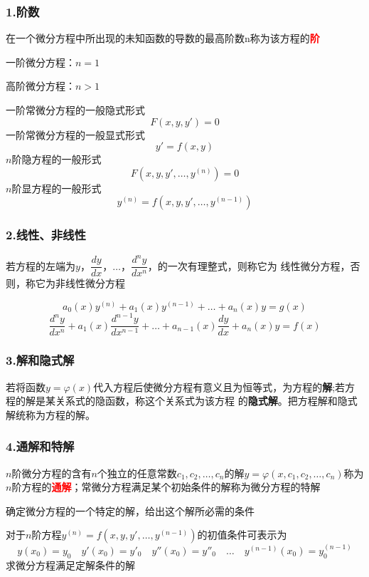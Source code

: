 \documentclass[oneside]{book} %
\begin{document}
\subsubsection{1.阶数}
\noindent {}在一个微分方程中所出现的未知函数的导数的最高阶数n称为该方程的\textbf{\textcolor{red}{阶}}

一阶微分方程：$n = 1$

高阶微分方程：$n > 1$

\noindent {}

\noindent 一阶常微分方程的一般隐式形式
$$ F(x,y,y') = 0$$
一阶常微分方程的一般显式形式
$$y' = f(x,y)$$
$n$阶隐方程的一般形式
$$ F(x,y,y',\dots,y^{(n)}) = 0$$
$n$阶显方程的一般形式
$$y^{(n)} = f(x,y,y',\dots,y^{(n-1)})$$


\subsubsection{2.线性、非线性}
\noindent {}若方程的左端为$y$，$\dfrac{dy}{dx}$，$\dots$，$\dfrac{d^n y}{d x^n} $，的一次有理整式，则称它为
线性微分方程，否则，称它为非线性微分方程

\noindent {}
$$a_{0}(x)y^{(n)} + a_{1}(x)y^{(n - 1)} + \dots + a_{n}(x)y = g(x)$$
$$\frac{d^n y}{d x^n} + a_{1}(x)\frac{d^{n-1} y}{d x^{n-1}} + \dots + a_{n -1}(x)\frac{dy}{dx} + a_{n}(x)y = f(x)  $$


\subsubsection{3.解和隐式解}
\noindent {}若将函数$y = \varphi(x)$代入方程后使微分方程有意义且为恒等式，为方程的\textbf{解};若方程的解是某关系式的隐函数，称这个关系式为该方程
的\textbf{隐式解}。把方程解和隐式解统称为方程的解。

\subsubsection{4.通解和特解}
\noindent {}$n$阶微分方程的含有$n$个独立的任意常数$c_{1},c_{2},\dots,c_{n}$的解$y = \varphi(x,c_{1},c_{2},\dots,c_{n})$称为$n$阶方程的\textcolor{red}{\textbf{通解}}；常微分方程满足某个初始条件的解称为微分方程的特解

\noindent {}确定微分方程的一个特定的解，给出这个解所必需的条件

\noindent {}对于$n$阶方程$y^{(n)} = f(x,y,y',\dots,y^{(n-1)})$的初值条件可表示为
$$y(x_{0}) = y_{0} \quad y'(x_{0}) = y'_{0} \quad y''(x_{0}) = y''_{0} \quad \dots \quad y^{(n-1)}(x_{0}) = y^{(n-1)}_{0}$$
求微分方程满足定解条件的解
\end{document}
